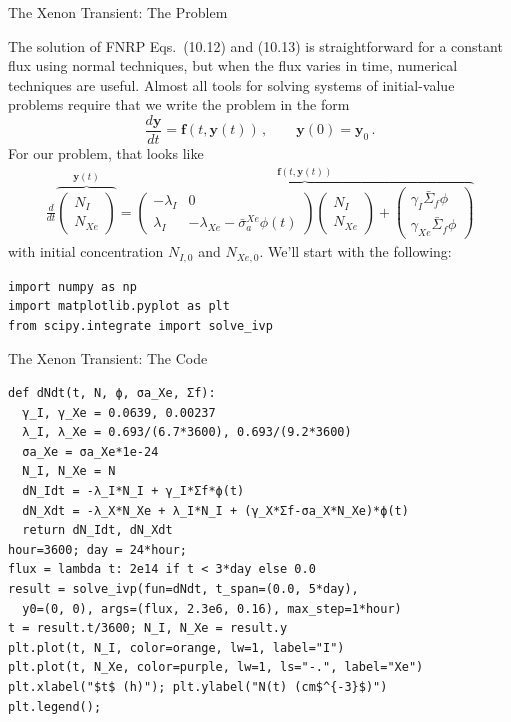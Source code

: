 \documentclass[aspectratio=1610]{beamer}
\begin{document}
\begin{frame}[fragile]{The Xenon Transient: The Problem}
 
The solution of FNRP Eqs.~(10.12) and (10.13) is straightforward for 
a constant flux using normal techniques, but when the flux varies in 
time, numerical techniques are useful.  Almost all tools for solving
systems of initial-value problems require that we write the problem
in the form 
\begin{equation*}
 \frac{d\mathbf{y}}{dt} = \mathbf{f}(t, \mathbf{y}(t)) \, , 
   \qquad \mathbf{y}(0) = \mathbf{y}_0 \, .
\end{equation*}
For our problem, that looks like
\begin{align*}
 \frac{d}{dt} 
 \overbrace{
 \begin{pmatrix}
    N_I \\ N_{Xe} 
 \end{pmatrix}}^{\mathbf{y}(t)} = 
 \overbrace{
 \begin{pmatrix}
     -\lambda_{I}    &  0 \\
      \lambda_{I}   & -\lambda_{Xe} -  \bar{\sigma}^{Xe}_a \phi(t)
 \end{pmatrix} 
 \begin{pmatrix}
    N_I \\ N_{Xe} 
 \end{pmatrix}
 +
 \begin{pmatrix}
   \gamma_{I} \bar{\Sigma}_f \phi \\
   \gamma_{Xe} \bar{\Sigma}_f \phi
 \end{pmatrix}}^{\mathbf{f}(t,\mathbf{y}(t))}
\end{align*}
with initial concentration $N_{I,0}$ and $N_{Xe,0}$.  We'll 
start with the following:
\begin{verbatim}
import numpy as np
import matplotlib.pyplot as plt
from scipy.integrate import solve_ivp
\end{verbatim} 
\end{frame}

\begin{frame}[fragile]{The Xenon Transient: The Code}
 
\begin{verbatim}
def dNdt(t, N, ϕ, σa_Xe, Σf):
  γ_I, γ_Xe = 0.0639, 0.00237
  λ_I, λ_Xe = 0.693/(6.7*3600), 0.693/(9.2*3600)
  σa_Xe = σa_Xe*1e-24
  N_I, N_Xe = N
  dN_Idt = -λ_I*N_I + γ_I*Σf*ϕ(t)
  dN_Xdt = -λ_X*N_Xe + λ_I*N_I + (γ_X*Σf-σa_X*N_Xe)*ϕ(t)
  return dN_Idt, dN_Xdt
hour=3600; day = 24*hour;
flux = lambda t: 2e14 if t < 3*day else 0.0
result = solve_ivp(fun=dNdt, t_span=(0.0, 5*day), 
  y0=(0, 0), args=(flux, 2.3e6, 0.16), max_step=1*hour)
t = result.t/3600; N_I, N_Xe = result.y
plt.plot(t, N_I, color=orange, lw=1, label="I")
plt.plot(t, N_Xe, color=purple, lw=1, ls="-.", label="Xe")
plt.xlabel("$t$ (h)"); plt.ylabel("N(t) (cm$^{-3}$)")
plt.legend();
\end{verbatim} 

\end{frame}
\end{document}
